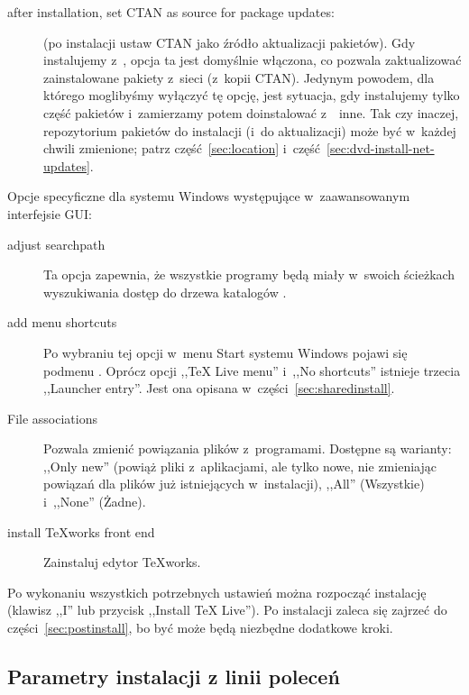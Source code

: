 \documentclass{article}
\begin{document}
\begin{description}
\item[after installation, set CTAN as source for package updates:] (po instalacji
 ustaw CTAN jako źródło aktualizacji pakietów).   Gdy instalujemy z~\DVD, opcja ta
 jest domyślnie włączona, co pozwala zaktualizować zainstalowane pakiety z~sieci (z~kopii
 CTAN). Jedynym powodem, dla którego moglibyśmy wyłączyć tę opcję, jest sytuacja,
 gdy instalujemy tylko część pakietów i~zamierzamy potem doinstalować z~\DVD\
 inne. Tak czy inaczej, repozytorium pakietów do instalacji (i~do aktualizacji)
 może być w~każdej chwili zmienione; patrz część~\ref{sec:location}
 i~część~\ref{sec:dvd-install-net-updates}.

\end{description}

Opcje specyficzne dla systemu Windows występujące w~zaawansowanym interfejsie GUI{}:
\begin{description}
\item[adjust searchpath] Ta opcja zapewnia, że wszystkie
  programy będą miały w~swoich ścieżkach wyszukiwania dostęp do drzewa
  katalogów \TL.

\item[add menu shortcuts] Po wybraniu tej opcji w~menu Start systemu
  Windows pojawi się podmenu \TL. Oprócz opcji ,,TeX Live menu''
  i~,,No shortcuts'' istnieje trzecia  ,,Launcher entry''.
  Jest ona opisana w~części~\ref{sec:sharedinstall}.

\item[File associations] Pozwala zmienić powiązania plików
  z~programami. Dostępne są warianty: ,,Only new'' (powiąż pliki
  z~aplikacjami, ale tylko nowe, nie zmieniając powiązań dla plików
  już istniejących w~instalacji), ,,All'' (Wszystkie) i~,,None'' (Żadne).

\item[install \TeX{}works front end] Zainstaluj edytor \TeX{}works.
\end{description}

Po wykonaniu wszystkich potrzebnych ustawień można rozpocząć
instalację (klawisz ,,I'' lub przycisk ,,Install TeX Live'').
Po instalacji zaleca się  zajrzeć do części~\ref{sec:postinstall},
bo być może będą niezbędne dodatkowe kroki.



\subsection{Parametry instalacji z linii poleceń}
\label{sec:cmdline}
\end{document}
